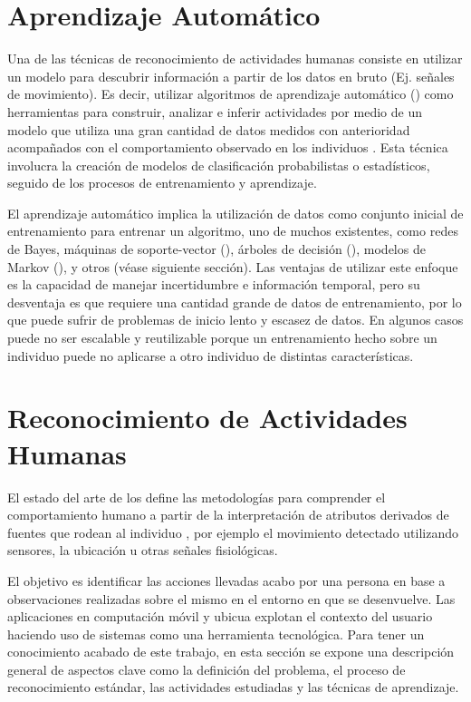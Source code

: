 \section{Aprendizaje Automático}

\label{sec25:aprendizaje-automatico}Una de las técnicas de reconocimiento
de actividades humanas consiste en utilizar un modelo para descubrir
información a partir de los datos en bruto (Ej. señales de movimiento).
Es decir, utilizar algoritmos de aprendizaje automático ()
como herramientas para construir, analizar e inferir actividades por
medio de un modelo que utiliza una gran cantidad de datos medidos
con anterioridad acompañados con el comportamiento observado en los
individuos \cite{Chen2012}. Esta técnica involucra la creación de
modelos de clasificación probabilistas o estadísticos, seguido de
los procesos de entrenamiento y aprendizaje.

El aprendizaje automático implica la utilización de datos como conjunto
inicial de entrenamiento para entrenar un algoritmo, uno de muchos
existentes, como redes de Bayes, máquinas de soporte-vector (),
árboles de decisión (), modelos de Markov (),
y otros \cite{Rajaraman2011} (véase siguiente sección). Las ventajas
de utilizar este enfoque es la capacidad de manejar incertidumbre
e información temporal, pero su desventaja es que requiere una cantidad
grande de datos de entrenamiento, por lo que puede sufrir de problemas
de inicio lento y escasez de datos. En algunos casos puede no ser
escalable y reutilizable porque un entrenamiento hecho sobre un individuo
puede no aplicarse a otro individuo de distintas características.

\section{Reconocimiento de Actividades Humanas}

El estado del arte de los define las metodologías para
comprender el comportamiento humano a partir de la interpretación
de atributos derivados de fuentes que rodean al individuo \cite{Bao2004,Poppe2007},
por ejemplo el movimiento detectado utilizando sensores, la ubicación
u otras señales fisiológicas. 

El objetivo es identificar las acciones llevadas acabo por una persona
en base a observaciones realizadas sobre el mismo en el entorno en
que se desenvuelve. Las aplicaciones en computación móvil y ubicua
explotan el contexto del usuario haciendo uso de sistemas 
como una herramienta tecnológica. Para tener un conocimiento acabado
de este trabajo, en esta sección se expone una descripción general
de aspectos clave como la definición del problema, el proceso de reconocimiento
estándar, las actividades estudiadas y las técnicas de aprendizaje.

